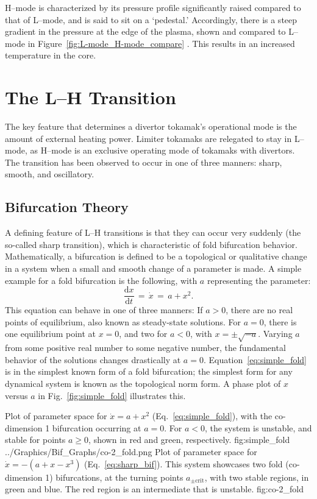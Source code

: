 H--mode is characterized by its pressure profile significantly raised compared to that of L--mode, and is said to sit on a `pedestal.'
Accordingly, there is a steep gradient in the pressure at the edge of the plasma, shown and compared to L--mode in Figure~\ref{fig:L-mode_H-mode_compare} \cite{weymiens_bifurcation_2014}.
This results in an increased temperature in the core.

\section{The L--H Transition}
The key feature that determines a divertor tokamak's operational mode is the amount of external heating power.
Limiter tokamaks are relegated to stay in L--mode, as H--mode is an exclusive operating mode of tokamaks with divertors.
The transition has been observed to occur in one of three manners: sharp, smooth, and oscillatory.

\subsection{Bifurcation Theory}
A defining feature of L--H transitions is that they can occur very suddenly (the so-called sharp transition), which is characteristic of fold bifurcation behavior.
Mathematically, a bifurcation is defined to be a topological or qualitative change in a system when a small and smooth change of a parameter is made.
A simple example for a fold bifurcation is the following, with $a$ representing the parameter:
\begin{equation}
	\frac{\text{d}x}{\text{d}t} \,=\, \dot{x} \,=\, a + x^2.
	\label{eq:simple_fold}
\end{equation}
This equation can behave in one of three manners:
If $a > 0$, there are no real points of equilibrium, also known as steady-state solutions.
For $a = 0$, there is one equilibrium point at $x = 0$, and two for $a < 0$, with $x = \pm\sqrt{-a}$.
Varying $a$ from some positive real number to some negative number, the fundamental behavior of the solutions changes drastically at $a = 0$.
Equation~\ref{eq:simple_fold} is in the simplest known form of a fold bifurcation; the simplest form for any dynamical system is known as the topological norm form.
A phase plot of $x$ versus $a$ in Fig.~\ref{fig:simple_fold} illustrates this.

	{Plot of parameter space for $\dot{x} = a + x^2$ (Eq.~\ref{eq:simple_fold}), with the co-dimension 1 bifurcation occurring at $a = 0$. %
	For $a < 0$, the system is unstable, and stable for points $a \geq 0$, shown in red and green, respectively.}
	{fig:simple_fold}
	{../Graphics/Bif_Graphs/co-2_fold.png}
	{Plot of parameter space for $\dot{x} = -(a + x - x^3)$ (Eq.~\ref{eq:sharp_bif}). %
	This system showcases two fold (co-dimension 1) bifurcations, at the turning points $a_{\pm\text{crit}}$, with two stable regions, in green and blue. %
	The red region is an intermediate that is unstable.}
	{fig:co-2_fold}

